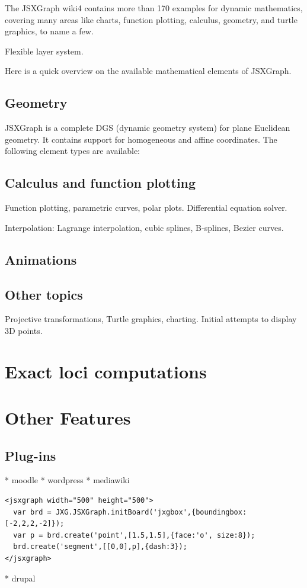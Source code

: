 \documentclass[12pt,a4paper]{article}%
\begin{document}
The JSXGraph wiki4 contains more than 170 examples for dynamic mathematics, 
covering many areas like charts, function plotting, calculus, geometry, and turtle graphics, 
to name a few.

Flexible layer system.

Here is a quick overview on the available mathematical elements of JSXGraph.

\subsection{Geometry}
JSXGraph is a complete DGS (dynamic geometry system) for plane Euclidean geometry.
It contains support for homogeneous and affine coordinates. 
The following element types are available:

\subsection{Calculus and function plotting}
Function plotting, parametric curves, polar plots. 
Differential equation solver.

Interpolation: Lagrange interpolation, 
cubic splines, B-splines, Bezier curves.

\subsection{Animations}


\subsection{Other topics}
Projective transformations,
Turtle graphics, 
charting.
Initial attempts to display 3D points.

\section{Exact loci computations}

\section{Other Features}
\subsection{Plug-ins}
    * moodle
    * wordpress
    * mediawiki
\begin{verbatim}
<jsxgraph width="500" height="500">
  var brd = JXG.JSXGraph.initBoard('jxgbox',{boundingbox:[-2,2,2,-2]});
  var p = brd.create('point',[1.5,1.5],{face:'o', size:8});
  brd.create('segment',[[0,0],p],{dash:3});
</jsxgraph>
\end{verbatim}                    
    * drupal 
\end{document}
